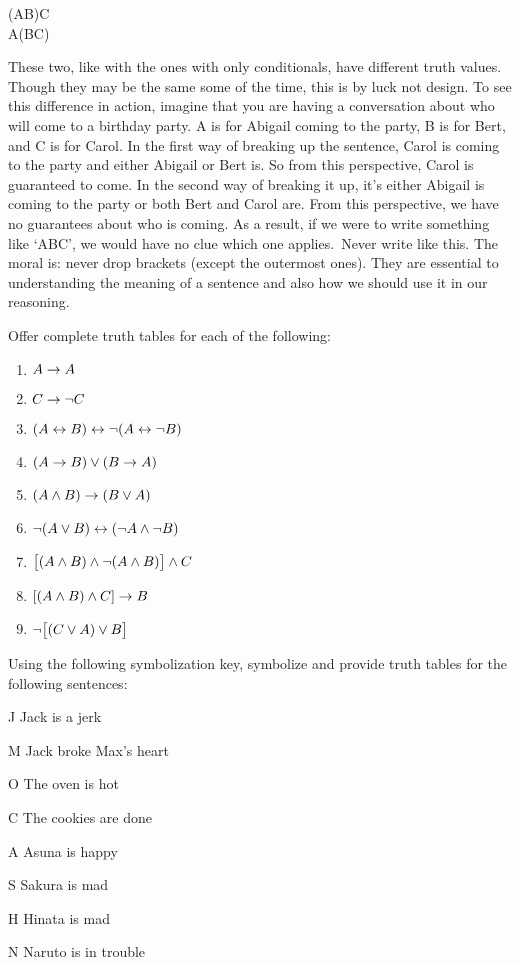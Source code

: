\begin{center}
(A\eor B)\eand C\\
A\eor (B\eand C)
\end{center}
These two, like with the ones with only conditionals, have different truth values. Though they may be the same some of the time, this is by luck not design. To see this difference in action, imagine that you are having a conversation about who will come to a birthday party. A is for Abigail coming to the party, B is for Bert, and C is for Carol. In the first way of breaking up the sentence, Carol is coming to the party and either Abigail or Bert is. So from this perspective, Carol is guaranteed to come. In the second way of breaking it up, it's either Abigail is coming to the party or both Bert and Carol are. From this perspective, we have no guarantees about who is coming. As a result, if we were to write something like `A\eor B\eand C', we would have no clue which one applies. Never write like this. The moral is: never drop brackets (except the outermost ones). They are essential to understanding the meaning of a sentence and also how we should use it in our reasoning. 

\practiceproblems\label{pr.TT.TTorC}
\problempart
Offer complete truth tables for each of the following:
\begin{enumerate}
\item $A \rightarrow A$ %
\item $C \rightarrow\neg C$ %
\item $(A \leftrightarrow B) \leftrightarrow \neg(A\leftrightarrow \neg B)$ %
\item $(A \rightarrow B) \vee (B \rightarrow A)$ %
\item $(A \wedge B) \rightarrow (B \vee A)$  %
\item $\neg(A \vee B) \leftrightarrow (\neg A \wedge \neg B)$ %
\item $\bigl[(A\wedge B) \wedge\neg(A\wedge B)\bigr] \wedge C$ %
\item $[(A \wedge B) \wedge C] \rightarrow B$ %
\item $\neg\bigl[(C\vee A) \vee B\bigr]$ %
\end{enumerate}
\problempart
Using the following symbolization key, symbolize and provide truth tables for the following sentences:
	\begin{ekey}
		\item[J]Jack is a jerk
		\item[M]Jack broke Max's heart
		\item[O] The oven is hot
		\item[C] The cookies are done
		\item[A] Asuna is happy
		\item[S] Sakura is mad
		\item[H] Hinata is mad
		\item[N] Naruto is in trouble
	\end{ekey}

